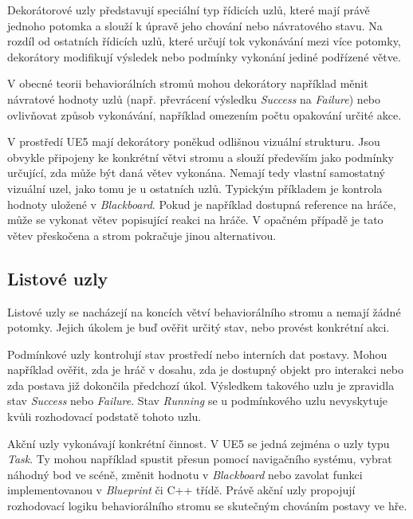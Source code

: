 Dekorátorové uzly představují speciální typ řídicích uzlů, které mají právě jednoho potomka a slouží k úpravě jeho chování nebo návratového stavu.\cite[s.~8--9]{colledanchise2018}
Na rozdíl od ostatních řídicích uzlů, které určují tok vykonávání mezi více potomky, dekorátory modifikují výsledek nebo podmínky vykonání jediné podřízené větve.

V obecné teorii behaviorálních stromů mohou dekorátory například měnit návratové hodnoty uzlů (např. převrácení výsledku \textit{Success} na \textit{Failure}) 
nebo ovlivňovat způsob vykonávání, například omezením počtu opakování určité akce.\cite[s.~9]{colledanchise2018}

V prostředí UE5 mají dekorátory poněkud odlišnou vizuální strukturu. 
Jsou obvykle připojeny ke konkrétní větvi stromu a slouží především jako podmínky určující, zda může být daná větev vykonána.\cite[s.~93]{butler2023}
Nemají tedy vlastní samostatný vizuální uzel, jako tomu je u ostatních uzlů.
Typickým příkladem je kontrola hodnoty uložené v \textit{Blackboard}. 
Pokud je například dostupná reference na hráče, může se vykonat větev popisující reakci na hráče. 
V opačném případě je tato větev přeskočena a strom pokračuje jinou alternativou.

\subsection{Listové uzly}

Listové uzly se nacházejí na koncích větví behaviorálního stromu a nemají žádné potomky. 
Jejich úkolem je buď ověřit určitý stav, nebo provést konkrétní akci.\cite[s.~6]{colledanchise2018}

Podmínkové uzly kontrolují stav prostředí nebo interních dat postavy. 
Mohou například ověřit, zda je hráč v dosahu, zda je dostupný objekt pro interakci nebo zda postava již dokončila předchozí úkol. 
Výsledkem takového uzlu je zpravidla stav \textit{Success} nebo \textit{Failure}.\cite[s.~8]{colledanchise2018}
Stav \textit{Running} se u podmínkového uzlu nevyskytuje kvůli rozhodovací podstatě tohoto uzlu.

Akční uzly vykonávají konkrétní činnost. 
V UE5 se jedná zejména o uzly typu \textit{Task}. 
Ty mohou například spustit přesun pomocí navigačního systému, vybrat náhodný bod ve scéně, změnit hodnotu v \textit{Blackboard} 
nebo zavolat funkci implementovanou v \textit{Blueprint} či C++ třídě. 
Právě akční uzly propojují rozhodovací logiku behaviorálního stromu se skutečným chováním postavy ve hře.

